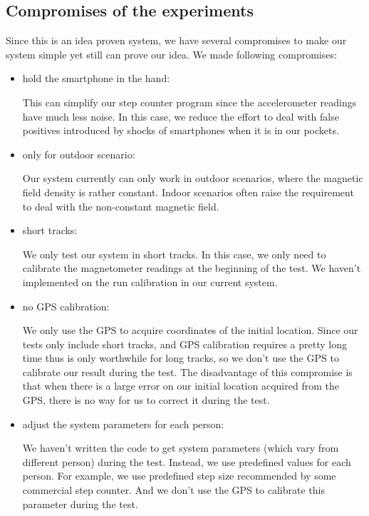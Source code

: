 \documentclass[journal]{IEEEtran}
\begin{document}
\subsection{Compromises of the experiments}
Since this is an idea proven system, we have several compromises to make our system simple yet still can prove our idea.
We made following compromises:
\begin{itemize}
	\item hold the smartphone in the hand: 

		This can simplify our step counter program since the accelerometer readings have much less noise. 
		In this case, we reduce the effort to deal with false positives introduced by shocks of smartphones when it is in our pockets.
	\item only for outdoor scenario: 

		Our system currently can only work in outdoor scenarios, where the magnetic field density is rather constant. 
		Indoor scenarios often raise the requirement to deal with the non-constant magnetic field.
	\item short tracks: 

		We only test our system in short tracks.
		In this case, we only need to calibrate the magnetometer readings at the beginning of the test.
		We haven't implemented on the run calibration in our current system.
	\item no GPS calibration: 

		We only use the GPS to acquire coordinates of the initial location.
		Since our tests only include short tracks, and GPS calibration requires a pretty long time thus is only worthwhile for long tracks, so we don't use the GPS to calibrate our result during the test.
		The disadvantage of this compromise is that when there is a large error on our initial location acquired from the GPS, there is no way for us to correct it during the test.

	\item adjust the system parameters for each person:

		We haven't written the code to get system parameters (which vary from different person) during the test.
		Instead, we use predefined values for each person.
		For example, we use predefined step size recommended by some commercial step counter. 
		And we don't use the GPS to calibrate this parameter during the test.
\end{itemize}
\end{document}
